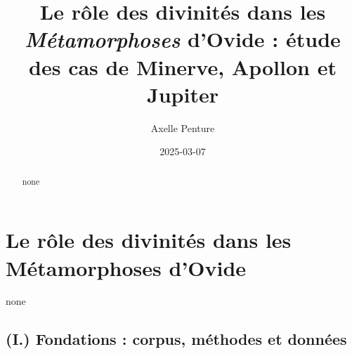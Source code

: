 \documentclass[
  letterpaper,
  DIV=11,
  numbers=noendperiod]{scrreprt}
\title{Le rôle des divinités dans les \emph{Métamorphoses} d'Ovide :
étude des cas de Minerve, Apollon et Jupiter}
\author{Axelle Penture}
\date{2025-03-07}
\renewcommand*\contentsname{Table of contents}
\newcommand\contentsname{Table of contents}
\begin{document}
\maketitle
\begin{abstract}
none
\end{abstract}

\renewcommand*\contentsname{Table of contents}
{
\hypersetup{linkcolor=}
\setcounter{tocdepth}{2}
\tableofcontents
}


\chapter{\texorpdfstring{Le rôle des divinités dans les
\textbf{Métamorphoses}
d'Ovide}{Le rôle des divinités dans les Métamorphoses d'Ovide}}\label{le-ruxf4le-des-divinituxe9s-dans-les-muxe9tamorphoses-dovide}

none

\hfill\break

\section{\texorpdfstring{\textbf{(I.) Fondations : corpus, méthodes et
données}}{(I.) Fondations : corpus, méthodes et données}}\label{i.-fondations-corpus-muxe9thodes-et-donnuxe9es}
\end{document}
